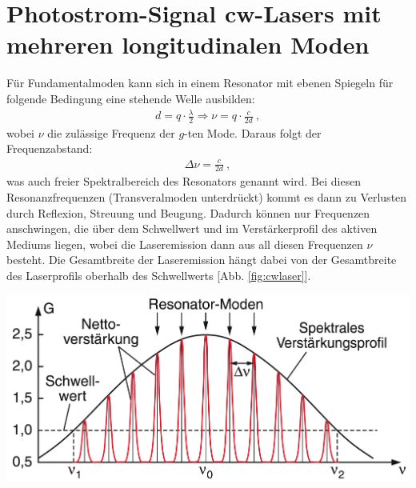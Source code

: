 
\section{Photostrom-Signal cw-Lasers mit mehreren longitudinalen Moden}
\label{sec:cwlaser}

Für Fundamentalmoden kann sich in einem Resonator mit ebenen Spiegeln für folgende Bedingung eine stehende Welle ausbilden:
\begin{gather}
    d = q \cdot \frac{\lambda}{2} \Rightarrow \nu = q \cdot \frac{c}{2d}~,
\end{gather}
wobei $\nu$ die zulässige Frequenz der $g$-ten Mode. Daraus folgt der Frequenzabstand:
\begin{gather}
    \boxed{\Delta \nu = \frac{c}{2d}}~,
\end{gather}
was auch freier Spektralbereich des Resonators genannt wird. Bei diesen Resonanzfrequenzen (Transveralmoden unterdrückt) kommt es dann zu Verlusten durch Reflexion, Streuung und Beugung. Dadurch können nur Frequenzen anschwingen, die über dem Schwellwert und im Verstärkerprofil des aktiven Mediums liegen, wobei die Laseremission dann aus all diesen Frequenzen $\nu$ besteht. Die Gesamtbreite der Laseremission hängt dabei von der Gesamtbreite des Laserprofils oberhalb des Schwellwerts [Abb. \ref{fig:cwlaser}]. \cite{DemtroederAtome}
\begin{center}
    \captionsetup{type=figure}
    \includegraphics[scale=0.2]{Bilder/Laserprofil.png}
    \label{fig:cwlaser}
\end{center}
